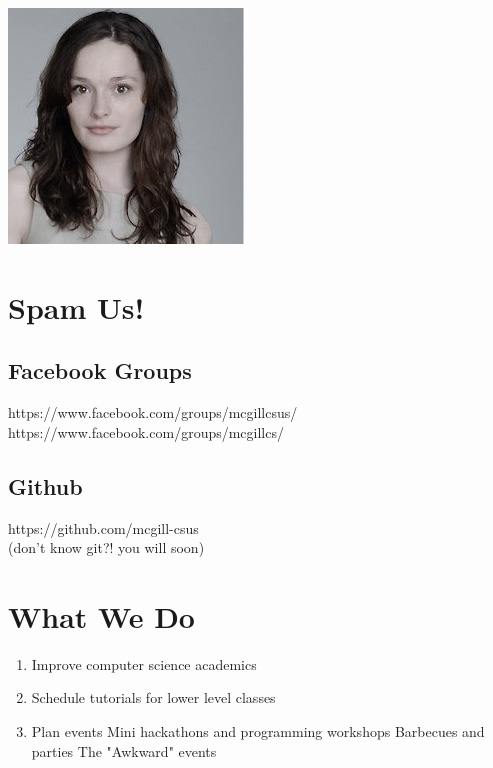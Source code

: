 \begin{center}
	 	\includegraphics[width=.35\textheight]{gfx/genevievethumb.jpg}
	\end{center}


\clearpage

\section{Spam Us!}

	\subsection{Facebook Groups}
		
		https://www.facebook.com/groups/mcgillcsus/ \\
		https://www.facebook.com/groups/mcgillcs/
		
	\subsection{Github}
	
		https://github.com/mcgill-csus \\
		(don't know git?!  you will soon)

\clearpage

\section{What We Do}

\begin{enumerate}
	\item Improve computer science academics
	\item Schedule tutorials for lower level classes
	\item Plan events
		\subitem Mini hackathons and programming workshops
		\subitem Barbecues and parties
		\subitem The "Awkward" events
\end{enumerate}

